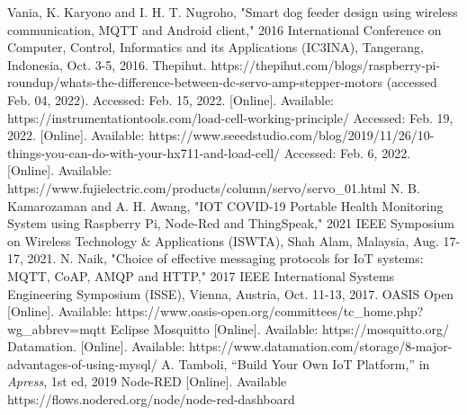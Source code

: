 \documentclass[conference]{IEEEtran}
\begin{document}
\begin{thebibliography}{00}
Vania, K. Karyono and I. H. T. Nugroho, "Smart dog feeder design using wireless communication, MQTT and Android client," 2016 International Conference on Computer, Control, Informatics and its Applications (IC3INA), Tangerang, Indonesia, Oct. 3-5, 2016.
Thepihut. https://thepihut.com/blogs/raspberry-pi-roundup/whats-the-difference-between-dc-servo-amp-stepper-motors (accessed Feb. 04, 2022).
Accessed: Feb. 15, 2022. [Online]. Available: https://instrumentationtools.com/load-cell-working-principle/
Accessed: Feb. 19, 2022. [Online]. Available: https://www.seeedstudio.com/blog/2019/11/26/10-things-you-can-do-with-your-hx711-and-load-cell/
Accessed: Feb. 6, 2022. [Online]. Available: https://www.fujielectric.com/products/column/servo/servo\_01.html
N. B. Kamarozaman and A. H. Awang, "IOT COVID-19 Portable Health Monitoring System using Raspberry Pi, Node-Red and ThingSpeak," 2021 IEEE Symposium on Wireless Technology \& Applications (ISWTA), Shah Alam, Malaysia, Aug. 17-17, 2021.
N. Naik, "Choice of effective messaging protocols for IoT systems: MQTT, CoAP, AMQP and HTTP," 2017 IEEE International Systems Engineering Symposium (ISSE), Vienna, Austria, Oct. 11-13, 2017.
OASIS Open [Online]. Available: https://www.oasis-open.org/committees/tc\_home.php?wg\_abbrev=mqtt
Eclipse Mosquitto [Online]. Available: https://mosquitto.org/
Datamation. [Online]. Available: https://www.datamation.com/storage/8-major-advantages-of-using-mysql/
A. Tamboli, “Build Your Own IoT Platform,” in \textit{Apress}, 1st ed, 2019
Node-RED [Online]. Available https://flows.nodered.org/node/node-red-dashboard

\end{thebibliography}
\vspace{12pt}
\end{document}

